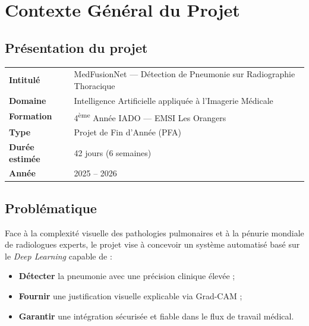 \documentclass[a4paper,12pt]{article}
\begin{document}
\newpage

\tableofcontents
\newpage

\section{Contexte Général du Projet}

\subsection{Présentation du projet}

\renewcommand{\arraystretch}{1.35}
\begin{tabularx}{\linewidth}{@{}>{\bfseries}l X@{}}
  \toprule
  Intitulé        & MedFusionNet — Détection de Pneumonie sur Radiographie Thoracique \\
  Domaine         & Intelligence Artificielle appliquée à l'Imagerie Médicale \\
  Formation       & 4\textsuperscript{ème} Année IADO — EMSI Les Orangers \\
  Type            & Projet de Fin d'Année (PFA) \\
  Durée estimée   & 42 jours (6 semaines) \\
  Année           & 2025 – 2026 \\
  \bottomrule
\end{tabularx}

\subsection{Problématique}

Face à la complexité visuelle des pathologies pulmonaires et à la pénurie mondiale de radiologues experts, le projet vise à concevoir un système automatisé basé sur le \textit{Deep Learning} capable de :

\begin{itemize}[leftmargin=1.5em, itemsep=4pt]
  \item \textbf{Détecter} la pneumonie avec une précision clinique élevée ;
  \item \textbf{Fournir} une justification visuelle explicable via Grad-CAM ;
  \item \textbf{Garantir} une intégration sécurisée et fiable dans le flux de travail médical.
\end{itemize}
\end{document}
